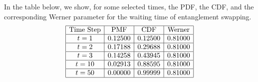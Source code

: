 \documentclass{masterthesis}
\begin{document}
In the table below, we show, for some selected times, the PDF, the CDF, and the corresponding Werner parameter for the waiting time of entanglement swapping.
\begin{equation*}
    \begin{array}{|c|c|c|c|}
        \hline
        \text{Time Step} & \text{PMF} & \text{CDF} & \text{Werner} \\
        \hline
        t = 1 & 0.12500 & 0.12500 & 0.81000 \\
        \hline
        t = 2 & 0.17188 & 0.29688 & 0.81000 \\
        \hline
        t = 3 & 0.14258 & 0.43945 & 0.81000 \\
        \hline
        t = 10 & 0.02913 & 0.88595 & 0.81000 \\
        \hline
        t = 50 & 0.00000 & 0.99999 & 0.81000 \\
        \hline
    \end{array}
\end{equation*}
\end{document}

